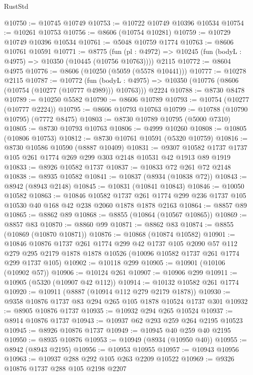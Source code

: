 \begin{lexlean}{RustStd}
\begin{coremodule}
@10750 := @10745 @10749
@10753 := @10722 @10749 @10396 @10534
@10754 := @10261 @10753
@10756 := @8606 (@10754 @10281)
@10759 := @10729 @10749 @10396 @10534
@10761 := @5048 @10759 @1774
@10763 := @8606 @10761 @10591
@10771 := @8775
    (fun (pl : @4972) => @10245 (fun (bodyL : @4975) => @10350 (@10445 (@10756 @10763))))
    @2115
@10772 := @8604 @4975
@10776 := @8606 (@10250 (@5059 (@5578 @10441)))
@10777 := @10278 @2115
@10787 := @10772
    (fun (bodyL : @4975) => @10350 (@10776 (@8606 (@10754 (@10277 (@10777 @4989))) @10763)))
    @2224
@10788 := @8730 @8478
@10789 := @10250 @5582
@10790 := @8606 @10789
@10793 := @10754 (@10277 (@10777 @2224))
@10795 := @8606 @10793 @10763
@10799 := @10788 (@10790 @10795) (@7772 @8475)
@10803 := @8730 @10789 @10795 (@5000 @7310)
@10805 := @8730 @10793 @10763
@10806 := @4999 @10260
@10808 := @10805 (@10806 @10753)
@10812 := @8730 @10761 @10591 (@5320 @10759)
@10816 := @8730 @10586 @10590 (@8887 @10409)
@10831 := @9307 @10582 @1737 @1737 @105 @261 @1774 @269 @299 @303 @2148 @10531 @42 @1913 @89 @1919
@10833 := @8926 @10582 @1737
@10837 := @10833 @72 @261 @72 @2148
@10838 := @8935 @10582
@10841 := @10837 (@8934 (@10838 @72))
@10843 := @8942 (@8943 @2148)
@10845 := @10831 (@10841 @10843)
@10846 := @10050 @10582
@10863 := @10846
    @10582
    @1737
    @261
    @1774
    @299
    @236
    @1737
    @105
    @10530
    @40
    @168
    @42
    @238
    @2060
    @1878
    @1878
    @2163
@10864 := @8857 @89
@10865 := @8862 @89
@10868 := @8855 (@10864 (@10567 @10865))
@10869 := @8857 @83
@10870 := @8860 @99
@10871 := @8862 @83
@10874 := @8855 (@10869 (@10870 @10871))
@10876 := @10868 (@10874 @10582)
@10901 := @10846
    @10876
    @1737
    @261
    @1774
    @299
    @42
    @1737
    @105
    @2090
    @57
    @112
    @279
    @295
    @2179
    @1878
    @1878
    @10526
    (@10096 @10582 @1737 @261 @1774 @299 @1737 @105)
@10902 := @10118 @299
@10905 := @10901 (@10106 (@10902 @57))
@10906 := @10124 @261
@10907 := @10906 @299
@10911 := @10905 (@5320 (@10907 @42 @112))
@10914 := @10132 @10582 @261 @1774
@10920 := @10911 (@8887 (@10914 @112 @279 @2179 @1878))
@10930 := @9358 @10876 @1737 @83 @294 @265 @105 @1878 @10524 @1737 @301
@10932 := @8905 @10876 @1737
@10935 := @10932 @294 @265 @10524
@10937 := @8914 @10876 @1737
@10943 := @10937 @62 @293 @259 @264 @2195 @10523
@10945 := @8926 @10876 @1737
@10949 := @10945 @40 @259 @40 @2195
@10950 := @8935 @10876
@10953 := @10949 (@8934 (@10950 @40))
@10955 := @8942 (@8943 @2195)
@10956 := @10953 @10955
@10957 := @10943 @10956
@10963 := @10937 @288 @292 @105 @263 @2209 @10522
@10969 := @9326 @10876 @1737 @288 @105 @2198 @2207

\end{coremodule}
\end{lexlean}

